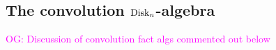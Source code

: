 \documentclass[11pt]{amsart}
\numberwithin{equation}{section}
\def\owen{\textcolor{magenta}{OG: }\textcolor{magenta}}
\def\greg{\textcolor{red}{GG: }\textcolor{red}}
\begin{document}
\subsection{The convolution ${\rm Disk}_n$-algebra}

\owen{Discussion of convolution fact algs commented out below}
%
%
%
\end{document}
